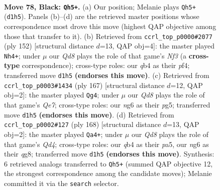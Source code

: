 \documentclass[11pt]{article}
\begin{document}
\clearpage

\begin{figure}[p]\centering
\begin{subfigure}{0.46\textwidth}\centering
\resizebox{\linewidth}{!}{%
\newchessgame
\chessboard[
  setfen={7K/8/6N1/8/1Q6/8/8/k2q4 b - - 26 78},
  showmover=false,
  pgfstyle=straightmove, color=movearrow, markmove={d1-h5}
]}
\caption{}
\end{subfigure}\hfill
\begin{subfigure}{0.46\textwidth}\centering
\resizebox{\linewidth}{!}{%
\newchessgame
\chessboard[
  setfen={8/4n3/6k1/8/5p2/1P3N2/7K/8 w - - 2 77},
  showmover=false,
  pgfstyle=straightmove, color=movearrow, markmove={f3-h4}
]}
\caption{}
\end{subfigure}
\\[4pt]
\begin{subfigure}{0.46\textwidth}\centering
\resizebox{\linewidth}{!}{%
\newchessgame
\chessboard[
  setfen={8/8/3Q2K1/1k4P1/8/8/4q3/8 b - - 12 84},
  showmover=false,
  pgfstyle=straightmove, color=movearrow, markmove={e2-g4}
]}
\caption{}
\end{subfigure}\hfill
\begin{subfigure}{0.46\textwidth}\centering
\resizebox{\linewidth}{!}{%
\newchessgame
\chessboard[
  setfen={6q1/3K4/7P/p7/3Q4/8/k7/8 w - - 18 85},
  showmover=false,
  pgfstyle=straightmove, color=movearrow, markmove={d4-a4}
]}
\caption{}
\end{subfigure}
\caption{\textbf{Move 78, Black: \texttt{Qh5+}.} (a) Our position; Melanie plays \texttt{Qh5+} (\texttt{d1h5}). Panels (b)--(d) are the retrieved master positions whose correspondence most drove this move (highest QAP objective among those that transfer to it). (b) Retrieved from \texttt{ccrl\_top\_p0000\#2077} (ply 152) [structural distance $d$=13, QAP obj=4]: the master played \texttt{Nh4+}; under $\mu$ our \emph{Qd8} plays the role of that game's \emph{Nf3} (a \textbf{cross-type} correspondence); cross-type roles: our \emph{q}b4 as their \emph{p}f4; transferred move \texttt{d1h5} \textbf{(endorses this move)}. (c) Retrieved from \texttt{ccrl\_top\_p0003\#1434} (ply 167) [structural distance $d$=12, QAP obj=2]: the master played \texttt{Qg4}; under $\mu$ our \emph{Qd8} plays the role of that game's \emph{Qe7}; cross-type roles: our \emph{n}g6 as their \emph{p}g5; transferred move \texttt{d1h5} \textbf{(endorses this move)}. (d) Retrieved from \texttt{ccrl\_top\_p0002\#127} (ply 168) [structural distance $d$=13, QAP obj=2]: the master played \texttt{Qa4+}; under $\mu$ our \emph{Qd8} plays the role of that game's \emph{Qd4}; cross-type roles: our \emph{q}b4 as their \emph{p}a5, our \emph{n}g6 as their \emph{q}g8; transferred move \texttt{d1h5} \textbf{(endorses this move)}. Synthesis: 6 retrieved analogs transferred to \texttt{Qh5+} (summed QAP objective 12, the strongest correspondence among the candidate moves); Melanie committed it via the \texttt{search} selector.}
\label{fig:thought-m155}
\end{figure}
\end{document}
